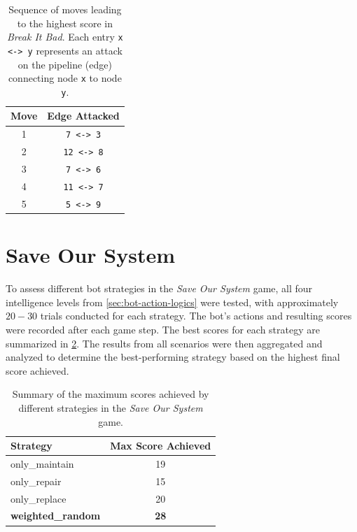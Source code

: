 \documentclass[12pt,a4paper]{report}
\begin{document}
        \begin{table}[h!]
            \centering
            \begin{tabular}{cc}
            \toprule
            \textbf{Move} & \textbf{Edge Attacked} \\
            \midrule
            1 & \texttt{7 <-> 3} \\
            2 & \texttt{12 <-> 8} \\
            3 & \texttt{7 <-> 6} \\
            4 & \texttt{11 <-> 7} \\
            5 & \texttt{5 <-> 9} \\
            \bottomrule
            \end{tabular}
            \caption{Sequence of moves leading to the highest score in \textit{Break It Bad}. Each entry \texttt{x <-> y} represents an attack on the pipeline (edge) connecting node \texttt{x} to node \texttt{y}.}
            \label{tab:breakitbad-moves}
        \end{table}
            
            
        \section{Save Our System}

        To assess different bot strategies in the \textit{Save Our System} game, all four intelligence levels from \cref{sec:bot-action-logics} were tested, with approximately $20-30$ trials conducted for each strategy. The bot’s actions and resulting scores were recorded after each game step. The best scores for each strategy are summarized in \cref{tab:strategy-comparison}. The results from all scenarios were then aggregated and analyzed to determine the best-performing strategy based on the highest final score achieved.

        \begin{table}[h!]
            \centering
            \begin{tabular}{lc}
            \toprule
            \textbf{Strategy} & \textbf{Max Score Achieved} \\
            \midrule
            only\_maintain & 19 \\
            only\_repair & 15 \\
            only\_replace & 20 \\
            \textbf{weighted\_random} & \textbf{28} \\
            \bottomrule
            \end{tabular}
            \caption{Summary of the maximum scores achieved by different strategies in the \textit{Save Our System} game.}
            \label{tab:strategy-comparison}
        \end{table}
            
\end{document}
